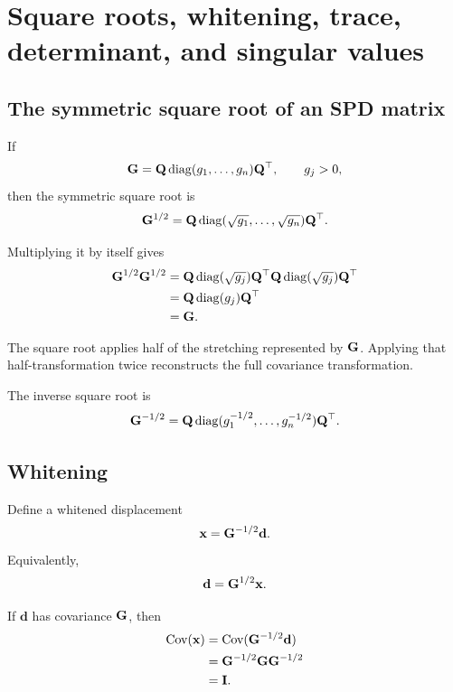 \chapter{Square roots, whitening, trace, determinant, and singular values}

\section{The symmetric square root of an SPD matrix}

If
\begin{equation}
\mathbf{G}=\mathbf Q\operatorname{diag}(g_1,\ldots,g_n)\mathbf Q^\top,
\qquad g_j>0,
\end{equation}
then the symmetric square root is
\begin{equation}
\mathbf{G}^{1/2}=\mathbf Q\operatorname{diag}(\sqrt{g_1},\ldots,\sqrt{g_n})\mathbf Q^\top.
\end{equation}

Multiplying it by itself gives
\begin{align}
\mathbf{G}^{1/2}\mathbf{G}^{1/2}
&=\mathbf Q\operatorname{diag}(\sqrt{g_j})\mathbf Q^\top
\mathbf Q\operatorname{diag}(\sqrt{g_j})\mathbf Q^\top\\
&=\mathbf Q\operatorname{diag}(g_j)\mathbf Q^\top\\
&=\mathbf{G}.
\end{align}

\inwords The square root applies half of the stretching represented by \(\mathbf{G}\). Applying that half-transformation twice reconstructs the full covariance transformation.

The inverse square root is
\begin{equation}
\mathbf{G}^{-1/2}=\mathbf Q\operatorname{diag}(g_1^{-1/2},\ldots,g_n^{-1/2})\mathbf Q^\top.
\end{equation}

\section{Whitening}

Define a whitened displacement
\begin{equation}
\mathbf x=\mathbf{G}^{-1/2}\mathbf d.
\label{eq:whiteningDef}
\end{equation}
Equivalently,
\begin{equation}
\mathbf d=\mathbf{G}^{1/2}\mathbf x.
\label{eq:unwhiteningDef}
\end{equation}

If \(\mathbf d\) has covariance \(\mathbf{G}\), then
\begin{align}
\operatorname{Cov}(\mathbf x)
&=\operatorname{Cov}(\mathbf{G}^{-1/2}\mathbf d)\\
&=\mathbf{G}^{-1/2}\mathbf{G}\mathbf{G}^{-1/2}\\
&=\mathbf{I}.
\end{align}

